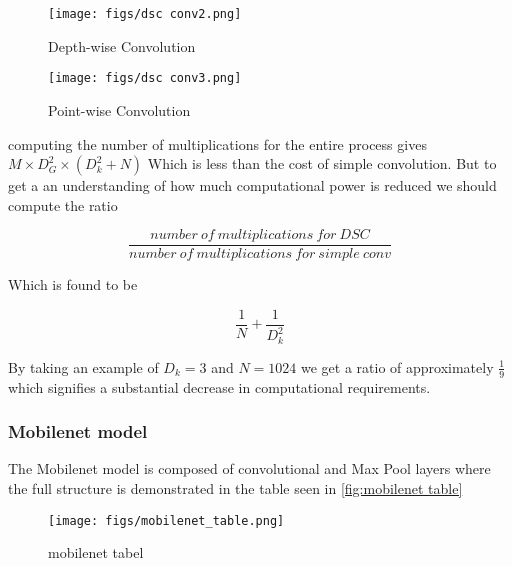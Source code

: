 \begin{figure}[ht]
	\centering
	\texttt{[image: figs/dsc conv2.png]}
	\caption{Depth-wise Convolution }\label{fig:dsc conv2}
\end{figure}

\begin{figure}[ht]
	\centering
	\texttt{[image: figs/dsc conv3.png]}
	\caption{Point-wise Convolution }\label{fig:dsc conv3}
\end{figure}

computing the number of multiplications for the entire process gives  $M \times D_{G}^{2} \times (D_{k}^{2}+N) $ Which is less than the cost of simple convolution. But to get a an understanding of how much computational power is reduced we should compute the ratio

$$
\frac{number\ of\ multiplications\ for\ DSC}{number\ of\ multiplications\ for\ simple\ conv}
$$

Which is found to be

$$
\frac{1}{N} + \frac{1}{D_{k}^2}
$$

By taking an example of $D_{k} = 3$ and $N = 1024$ we get a ratio of approximately $\frac{1}{9}$ which signifies a substantial decrease in computational requirements.

\subsubsection{Mobilenet model}

The Mobilenet model is composed of convolutional and Max Pool layers where the full structure is demonstrated in the table seen in \cref{fig:mobilenet table}

\begin{figure}[ht]
	\centering
	\texttt{[image: figs/mobilenet\_table.png]}
	\caption{mobilenet tabel }\label{fig:mobilenet tabel}
\end{figure}

